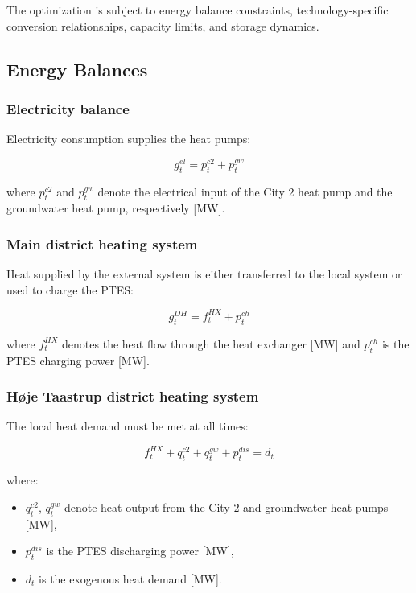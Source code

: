 The optimization is subject to energy balance constraints, technology-specific conversion relationships, capacity limits, and storage dynamics.

\subsection{Energy Balances}

\subsubsection*{Electricity balance} 

Electricity consumption supplies the heat pumps:

\begin{equation}
g^{el}_{t} = p^{c2}_{t} + p^{gw}_{t}
\end{equation}

where \(p^{c2}_{t}\) and \(p^{gw}_{t}\) denote the electrical input of the City 2 heat pump and the groundwater heat pump, respectively [MW].

\subsubsection*{Main district heating system} 

Heat supplied by the external system is either transferred to the local system or used to charge the PTES:

\begin{equation}
g^{DH}_{t} = f^{HX}_{t} + p^{ch}_{t}
\end{equation}

where \(f^{HX}_{t}\) denotes the heat flow through the heat exchanger [MW] and \(p^{ch}_{t}\) is the PTES charging power [MW].

\subsubsection*{Høje Taastrup district heating system}

The local heat demand must be met at all times:

\begin{equation}
f^{HX}_{t} + q^{c2}_{t} + q^{gw}_{t} + p^{dis}_{t} = d_t
\end{equation}

where:
\begin{itemize}
    \item \(q^{c2}_{t}\), \(q^{gw}_{t}\) denote heat output from the City 2 and groundwater heat pumps [MW],
    \item \(p^{dis}_{t}\) is the PTES discharging power [MW],
    \item \(d_t\) is the exogenous heat demand [MW].
\end{itemize}

